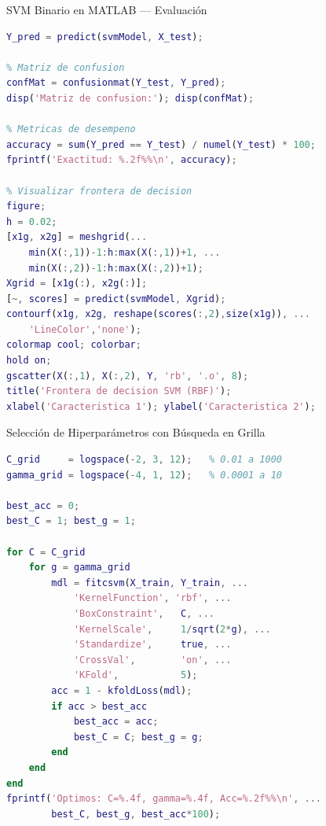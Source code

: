 \documentclass[aspectratio=169,xcolor=dvipsnames]{beamer}
\begin{document}
\begin{frame}[fragile]{SVM Binario en MATLAB — Evaluación}
\begin{lstlisting}[language=Matlab, style=MATLABStyle]
% Prediccion en conjunto de prueba
Y_pred = predict(svmModel, X_test);

% Matriz de confusion
confMat = confusionmat(Y_test, Y_pred);
disp('Matriz de confusion:'); disp(confMat);

% Metricas de desempeno
accuracy = sum(Y_pred == Y_test) / numel(Y_test) * 100;
fprintf('Exactitud: %.2f%%\n', accuracy);

% Visualizar frontera de decision
figure;
h = 0.02;
[x1g, x2g] = meshgrid(...
    min(X(:,1))-1:h:max(X(:,1))+1, ...
    min(X(:,2))-1:h:max(X(:,2))+1);
Xgrid = [x1g(:), x2g(:)];
[~, scores] = predict(svmModel, Xgrid);
contourf(x1g, x2g, reshape(scores(:,2),size(x1g)), ...
    'LineColor','none');
colormap cool; colorbar;
hold on;
gscatter(X(:,1), X(:,2), Y, 'rb', '.o', 8);
title('Frontera de decision SVM (RBF)');
xlabel('Caracteristica 1'); ylabel('Caracteristica 2');
\end{lstlisting}
\end{frame}

\begin{frame}[fragile]{Selección de Hiperparámetros con Búsqueda en Grilla}
\begin{lstlisting}[language=Matlab, style=MATLABStyle]
% Grilla logaritmica de C y gamma
C_grid     = logspace(-2, 3, 12);   % 0.01 a 1000
gamma_grid = logspace(-4, 1, 12);   % 0.0001 a 10

best_acc = 0;
best_C = 1; best_g = 1;

for C = C_grid
    for g = gamma_grid
        mdl = fitcsvm(X_train, Y_train, ...
            'KernelFunction', 'rbf', ...
            'BoxConstraint',   C, ...
            'KernelScale',     1/sqrt(2*g), ...
            'Standardize',     true, ...
            'CrossVal',        'on', ...
            'KFold',           5);
        acc = 1 - kfoldLoss(mdl);
        if acc > best_acc
            best_acc = acc;
            best_C = C; best_g = g;
        end
    end
end
fprintf('Optimos: C=%.4f, gamma=%.4f, Acc=%.2f%%\n', ...
        best_C, best_g, best_acc*100);
\end{lstlisting}
\end{frame}
\end{document}
